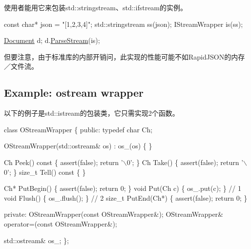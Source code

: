 使用者能用它来包装{\ttfamily std\+::stringstream}、{\ttfamily std\+::ifstream}的实例。


\begin{DoxyCode}
\textcolor{keyword}{const} \textcolor{keywordtype}{char}* json = \textcolor{stringliteral}{"[1,2,3,4]"};
std::stringstream ss(json);
IStreamWrapper is(ss);

\hyperlink{class_generic_document}{Document} d;
d.\hyperlink{class_generic_document_afe94c0abc83a20f2d7dc1ba7677e6238}{ParseStream}(is);
\end{DoxyCode}


但要注意，由于标准库的内部开销问，此实现的性能可能不如\+Rapid\+J\+S\+O\+N的内存／文件流。\hypertarget{md_Commun_Externe_RapidJSON_doc_stream.zh-cn_ExampleOStreamWrapper}{}\subsection{Example\+: ostream wrapper}\label{md_Commun_Externe_RapidJSON_doc_stream.zh-cn_ExampleOStreamWrapper}
以下的例子是{\ttfamily std\+::istream}的包装类，它只需实现2个函数。


\begin{DoxyCode}
\textcolor{keyword}{class }OStreamWrapper \{
\textcolor{keyword}{public}:
    \textcolor{keyword}{typedef} \textcolor{keywordtype}{char} Ch;

    OStreamWrapper(std::ostream& os) : os\_(os) \{
    \}

    Ch Peek()\textcolor{keyword}{ const }\{ assert(\textcolor{keyword}{false}); \textcolor{keywordflow}{return} \textcolor{charliteral}{'\(\backslash\)0'}; \}
    Ch Take() \{ assert(\textcolor{keyword}{false}); \textcolor{keywordflow}{return} \textcolor{charliteral}{'\(\backslash\)0'}; \}
    \textcolor{keywordtype}{size\_t} Tell()\textcolor{keyword}{ const }\{  \}

    Ch* PutBegin() \{ assert(\textcolor{keyword}{false}); \textcolor{keywordflow}{return} 0; \}
    \textcolor{keywordtype}{void} Put(Ch c) \{ os\_.put(c); \}                  \textcolor{comment}{// 1}
    \textcolor{keywordtype}{void} Flush() \{ os\_.flush(); \}                   \textcolor{comment}{// 2}
    \textcolor{keywordtype}{size\_t} PutEnd(Ch*) \{ assert(\textcolor{keyword}{false}); \textcolor{keywordflow}{return} 0; \}

\textcolor{keyword}{private}:
    OStreamWrapper(\textcolor{keyword}{const} OStreamWrapper&);
    OStreamWrapper& operator=(\textcolor{keyword}{const} OStreamWrapper&);

    std::ostream& os\_;
\};
\end{DoxyCode}


